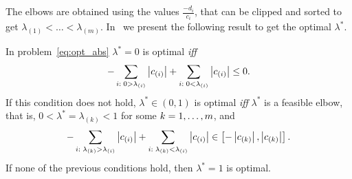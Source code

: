 The elbows are obtained using the values $\frac{-d_i}{c_i}$, that can be clipped and sorted to get ${\lambda}_{(1)} < \ldots < {\lambda}_{(m)}$.
In~\citet[Proposition 2]{RuizAD21} we present the following result to get the optimal $\lambda^*$.
\begin{prop}\label{prop:abs_neurocom2020}
    In problem~\eqref{eq:opt_abs} $\lambda^*=0$ is optimal \emph{iff}
    \begin{equation}\nonumber
        - \sum_{i: \; 0 > \lambda_{(i)}} \left|c_{(i)}\right| + \sum_{i: \; 0 < \lambda_{(i)}} \left|c_{(i)}\right| \leq 0.
        \end{equation}
    If this condition does not hold, $\lambda^* \in (0,1)$ is optimal \emph{iff} $\lambda^*$ is a feasible elbow, that is, $0 < \lambda^* = \lambda_{(k)} < 1$ for some $k=1, \dotsc, m$, and
    \begin{equation}
    \nonumber    
    - \sum_{i:\; \lambda_{(k)} > \lambda_{(i)}} \left|c_{(i)}\right| + \sum_{i:\; \lambda_{(k)} < \lambda_{(i)}} \left|c_{(i)}\right| \in \left[ -  \left|c_{(k)}\right|,  \left|c_{(k)}\right|  \right] .
    \end{equation}
    If none of the previous conditions hold, then $\lambda^*=1$ is optimal.
\end{prop}
